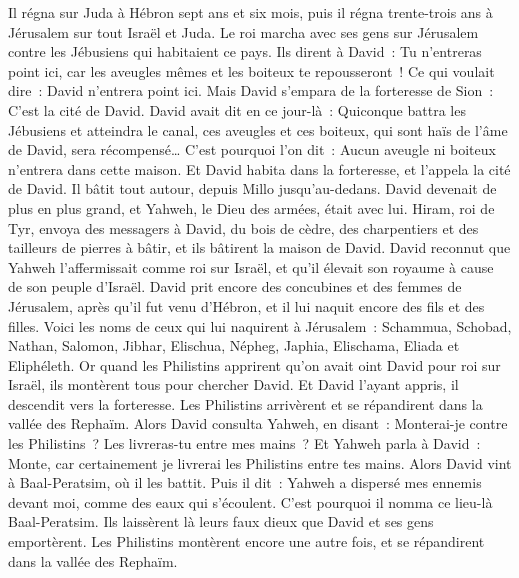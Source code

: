\begin{multicols}{2}
Il régna sur Juda à Hébron sept ans et six mois, puis il régna trente-trois ans à Jérusalem sur tout Israël et Juda.
Le roi marcha avec ses gens sur Jérusalem contre les Jébusiens qui habitaient ce pays. Ils dirent à David~: Tu n'entreras point ici, car les aveugles mêmes et les boiteux te repousseront~! Ce qui voulait dire~: David n'entrera point ici.
Mais David s'empara de la forteresse de Sion~: C'est la cité de David.
David avait dit en ce jour-là~: Quiconque battra les Jébusiens et atteindra le canal, ces aveugles et ces boiteux, qui sont haïs de l'âme de David, sera récompensé… C'est pourquoi l'on dit~: Aucun aveugle ni boiteux n'entrera dans cette maison.
Et David habita dans la forteresse, et l'appela la cité de David. Il bâtit tout autour, depuis Millo jusqu'au-dedans.
David devenait de plus en plus grand, et Yahweh, le Dieu des armées, était avec lui.
Hiram, roi de Tyr, envoya des messagers à David, du bois de cèdre, des charpentiers et des tailleurs de pierres à bâtir, et ils bâtirent la maison de David.
David reconnut que Yahweh l'affermissait comme roi sur Israël, et qu'il élevait son royaume à cause de son peuple d'Israël.
David prit encore des concubines et des femmes de Jérusalem, après qu'il fut venu d'Hébron, et il lui naquit encore des fils et des filles.
Voici les noms de ceux qui lui naquirent à Jérusalem~: Schammua, Schobad, Nathan, Salomon,
Jibhar, Elischua, Népheg, Japhia,
Elischama, Eliada et Eliphéleth.
Or quand les Philistins apprirent qu'on avait oint David pour roi sur Israël, ils montèrent tous pour chercher David. Et David l'ayant appris, il descendit vers la forteresse.
Les Philistins arrivèrent et se répandirent dans la vallée des Rephaïm.
Alors David consulta Yahweh, en disant~: Monterai-je contre les Philistins~? Les livreras-tu entre mes mains~? Et Yahweh parla à David~: Monte, car certainement je livrerai les Philistins entre tes mains.
Alors David vint à Baal-Peratsim, où il les battit. Puis il dit~: Yahweh a dispersé mes ennemis devant moi, comme des eaux qui s'écoulent. C'est pourquoi il nomma ce lieu-là Baal-Peratsim.
Ils laissèrent là leurs faux dieux que David et ses gens emportèrent.
Les Philistins montèrent encore une autre fois, et se répandirent dans la vallée des Rephaïm.

\end{multicols}
